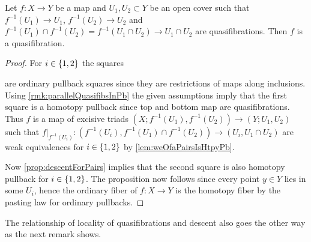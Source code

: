 \begin{corollary}\label{cor:locOfQuasifib}
    Let $f\colon X\to Y$ be a map and $U_1, U_2\subset Y$ be an open cover such that $f^{-1}(U_1)\to U_1$, $f^{-1}(U_2)\to U_2$ and $f^{-1}(U_1)\cap f^{-1}(U_2)=f^{-1}(U_1\cap U_2)\to U_1\cap U_2$ are quasifibrations.
    Then $f$ is a quasifibration.
    \begin{proof}
        For $i\in\left\lbrace1,2\right\rbrace$ the squares 
        \begin{center}
        \end{center} 
        are ordinary pullback squares since they are restrictions of maps along inclusions.
        Using \cref{rmk:parallelQuasifibsInPb} the given assumptions imply that the first square is a homotopy pullback since top and bottom map are quasifibrations.
        Thus $f$ is a map of excisive triads $(X;f^{-1}(U_1),f^{-1}(U_2))\to(Y;U_1,U_2)$ such that $f|_{f^{-1}(U_i)}\colon(f^{-1}(U_i),f^{-1}(U_1)\cap f^{-1}(U_2))\to (U_i,U_1\cap U_2)$ are weak equivalences for $i\in\left\lbrace1,2\right\rbrace$ by \cref{lem:weOfaPairsIsHtpyPb}.

        Now \cref{prop:descentForPairs} implies that the second square is also homotopy pullback for $i\in\left\lbrace1,2\right\rbrace$.
        The proposition now follows since every point $y\in Y$ lies in some $U_i$, hence the ordinary fiber of $f\colon X\to Y$ is the homotopy fiber by the pasting law for ordinary pullbacks.
    \end{proof}
\end{corollary}
The relationship of locality of quasifibrations and descent also goes the other way as the next remark shows.
